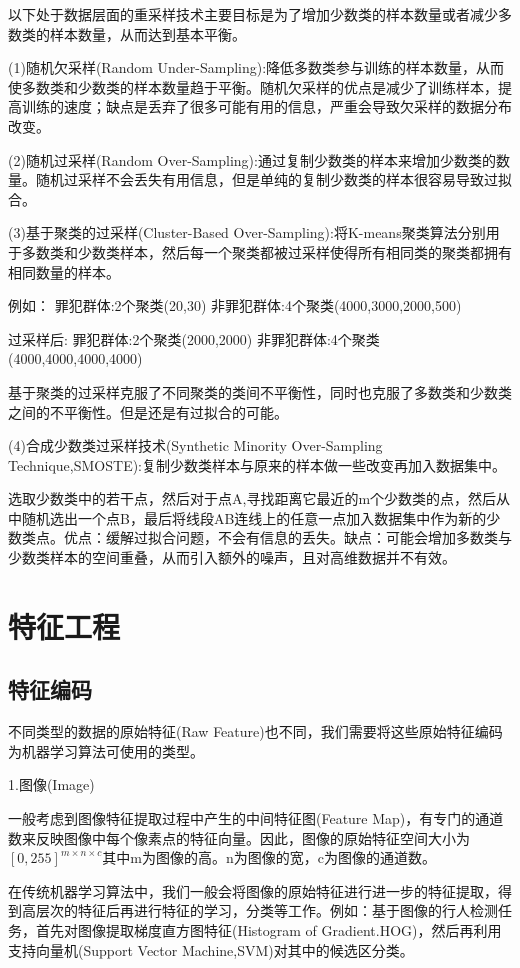 \documentclass[openbib]{article}
\begin{document}
以下处于数据层面的重采样技术主要目标是为了增加少数类的样本数量或者减少多数类的样本数量，从而达到基本平衡。

(1)随机欠采样(Random Under-Sampling):降低多数类参与训练的样本数量，从而使多数类和少数类的样本数量趋于平衡。随机欠采样的优点是减少了训练样本，提高训练的速度；缺点是丢弃了很多可能有用的信息，严重会导致欠采样的数据分布改变。

(2)随机过采样(Random Over-Sampling):通过复制少数类的样本来增加少数类的数量。随机过采样不会丢失有用信息，但是单纯的复制少数类的样本很容易导致过拟合。

(3)基于聚类的过采样(Cluster-Based Over-Sampling):将K-means聚类算法分别用于多数类和少数类样本，然后每一个聚类都被过采样使得所有相同类的聚类都拥有相同数量的样本。

例如：
罪犯群体:2个聚类(20,30) \qquad 非罪犯群体:4个聚类(4000,3000,2000,500)

过采样后:
罪犯群体:2个聚类(2000,2000) \qquad 非罪犯群体:4个聚类(4000,4000,4000,4000)

基于聚类的过采样克服了不同聚类的类间不平衡性，同时也克服了多数类和少数类之间的不平衡性。但是还是有过拟合的可能。

(4)合成少数类过采样技术(Synthetic Minority Over-Sampling Technique,SMOSTE):复制少数类样本与原来的样本做一些改变再加入数据集中。

选取少数类中的若干点，然后对于点A,寻找距离它最近的m个少数类的点，然后从中随机选出一个点B，最后将线段AB连线上的任意一点加入数据集中作为新的少数类点。优点：缓解过拟合问题，不会有信息的丢失。缺点：可能会增加多数类与少数类样本的空间重叠，从而引入额外的噪声，且对高维数据并不有效。

\section{特征工程}
\subsection{特征编码}
不同类型的数据的原始特征(Raw Feature)也不同，我们需要将这些原始特征编码为机器学习算法可使用的类型。

\begin{center}
	1.图像(Image)
\end{center}
一般考虑到图像特征提取过程中产生的中间特征图(Feature Map)，有专门的通道数来反映图像中每个像素点的特征向量。因此，图像的原始特征空间大小为$[0,255]^{m\times n\times c}$其中m为图像的高。n为图像的宽，c为图像的通道数。

在传统机器学习算法中，我们一般会将图像的原始特征进行进一步的特征提取，得到高层次的特征后再进行特征的学习，分类等工作。例如：基于图像的行人检测任务，首先对图像提取梯度直方图特征(Histogram of Gradient.HOG)，然后再利用支持向量机(Support Vector Machine,SVM)对其中的候选区分类。
\end{document}
